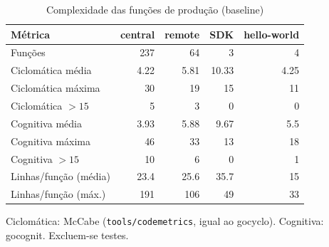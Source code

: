 \begin{table}[htbp]
  \centering\small
  \caption{Complexidade das funções de produção (baseline)}
  \label{tab:baseline-complexidade}
  \begin{tabular}{lrrrr}
    \toprule
    Métrica & central & remote & SDK & hello-world \\
    \midrule
    Funções & 237 & 64 & 3 & 4 \\
    Ciclomática média & 4.22 & 5.81 & 10.33 & 4.25 \\
    Ciclomática máxima & 30 & 19 & 15 & 11 \\
    Ciclomática $>15$ & 5 & 3 & 0 & 0 \\
    Cognitiva média & 3.93 & 5.88 & 9.67 & 5.5 \\
    Cognitiva máxima & 46 & 33 & 13 & 18 \\
    Cognitiva $>15$ & 10 & 6 & 0 & 1 \\
    Linhas/função (média) & 23.4 & 25.6 & 35.7 & 15 \\
    Linhas/função (máx.) & 191 & 106 & 49 & 33 \\
    \bottomrule
  \end{tabular}
  \par\smallskip\footnotesize Ciclomática: McCabe (\texttt{tools/codemetrics}, igual ao gocyclo). Cognitiva: gocognit. Excluem-se testes.
\end{table}

